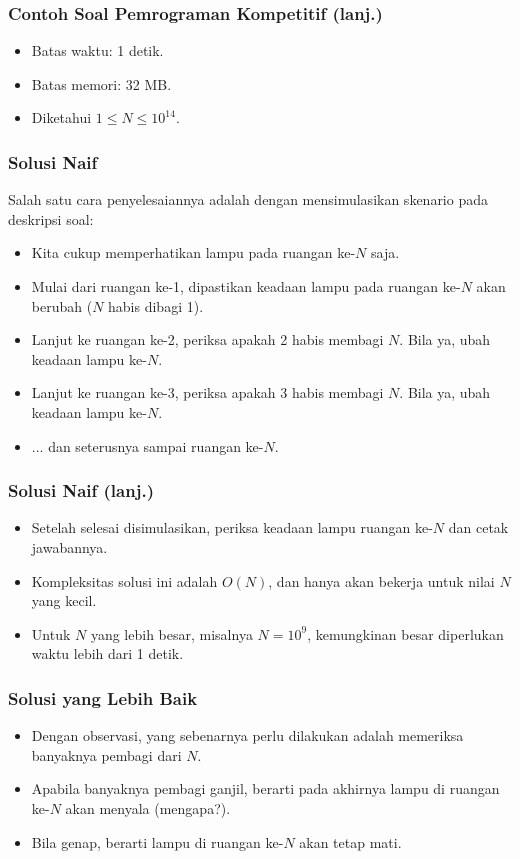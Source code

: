 \begin{frame}
\frametitle{Contoh Soal Pemrograman Kompetitif (lanj.)}
\begin{itemize}
  \item Batas waktu: 1 detik.
  \item Batas memori: 32 MB.
  \item Diketahui $1 \leq N \leq 10^{14}$.
\end{itemize}
\end{frame}

\begin{frame}
\frametitle{Solusi Naif}
Salah satu cara penyelesaiannya adalah dengan mensimulasikan skenario pada deskripsi soal:
\begin{itemize}
  \item Kita cukup memperhatikan lampu pada ruangan ke-$N$ saja.
  \item Mulai dari ruangan ke-1, dipastikan keadaan lampu pada ruangan ke-$N$ akan berubah ($N$ habis dibagi 1).
  \item Lanjut ke ruangan ke-2, periksa apakah 2 habis membagi $N$. Bila ya, ubah keadaan lampu ke-$N$.
  \item Lanjut ke ruangan ke-3, periksa apakah 3 habis membagi $N$. Bila ya, ubah keadaan lampu ke-$N$.
  \item ... dan seterusnya sampai ruangan ke-$N$.
\end{itemize}
\end{frame}

\begin{frame}
\frametitle{Solusi Naif (lanj.)}
\begin{itemize}
  \item Setelah selesai disimulasikan, periksa keadaan lampu ruangan ke-$N$ dan cetak jawabannya.
  \item Kompleksitas solusi ini adalah $O(N)$, dan hanya akan bekerja untuk nilai $N$ yang kecil.
  \item Untuk $N$ yang lebih besar, misalnya $N = 10^9$, kemungkinan besar diperlukan waktu lebih dari 1 detik.
\end{itemize}
\end{frame}

\begin{frame}
\frametitle{Solusi yang Lebih Baik}
\begin{itemize}
  \item Dengan observasi, yang sebenarnya perlu dilakukan adalah memeriksa banyaknya pembagi dari $N$.
  \item Apabila banyaknya pembagi ganjil, berarti pada akhirnya lampu di ruangan ke-$N$ akan menyala (mengapa?).
  \item Bila genap, berarti lampu di ruangan ke-$N$ akan tetap mati.
\end{itemize}
\end{frame}

